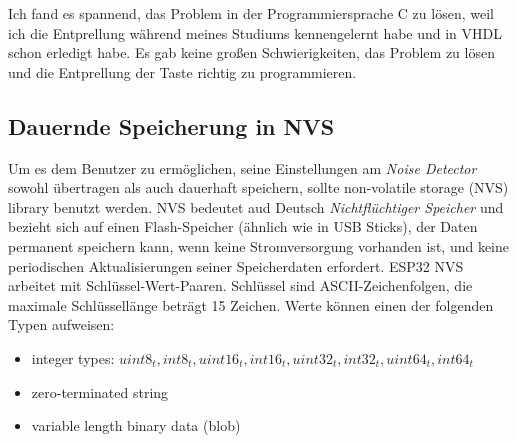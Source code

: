 Ich fand es spannend, das Problem in der Programmiersprache C zu lösen, weil ich die Entprellung während meines Studiums kennengelernt habe und in VHDL schon erledigt habe. Es gab keine großen Schwierigkeiten, das Problem zu lösen und die Entprellung der Taste richtig zu programmieren.

\subsection{Dauernde Speicherung in NVS}
\label{sec:main:nvm}
Um es dem Benutzer zu ermöglichen, seine Einstellungen am \textit{Noise Detector} sowohl übertragen als auch dauerhaft speichern, sollte non-volatile storage (NVS) library benutzt werden. NVS bedeutet aud Deutsch \textit{Nichtflüchtiger Speicher} und bezieht sich auf einen Flash-Speicher (ähnlich wie in USB Sticks), der Daten permanent speichern kann, wenn keine Stromversorgung vorhanden ist, und keine periodischen Aktualisierungen seiner Speicherdaten erfordert. ESP32 NVS arbeitet mit Schlüssel-Wert-Paaren. Schlüssel sind ASCII-Zeichenfolgen, die maximale Schlüssellänge beträgt 15 Zeichen. Werte können einen der folgenden Typen aufweisen:

\begin{itemize}
	\item integer types: $uint8_t, int8_t, uint16_t, int16_t, uint32_t, int32_t, uint64_t, int64_t$
	\item zero-terminated string
	\item variable length binary data (blob)
\end{itemize}

